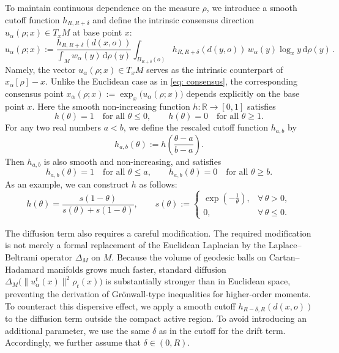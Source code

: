 \documentclass[11pt]{amsart}
\def\d{\mathrm{d}}
\newcommand{\p}{o}%
\newcommand{\dist}{d}%
\begin{document}
To maintain continuous dependence on the measure $\rho$, we introduce a smooth cutoff function $h_{R,R+\delta}$ and define the intrinsic consensus direction $u_\alpha(\rho; x) \in T_xM$ at base point $x$:
\[
u_\alpha(\rho; x):=
\frac{h_{R,R+\delta}(\dist(x,\p))}{\int_M w_\alpha(y)\, \d\rho(y)}
\int_{B_{R+\delta}(\p)} h_{R,R+\delta}(\dist(y,\p))\, w_\alpha(y)\log_x y\, \d\rho(y)\,.
\]
 Namely, the vector $u_\alpha(\rho;x)\in T_xM$ serves as the intrinsic counterpart of $x_\alpha[\rho]-x$.
Unlike the Euclidean case as in \eqref{eq: consensus}, the corresponding consensus point $x_\alpha(\rho;x):=\exp_x\bigl(u_\alpha(\rho;x)\bigr)$ depends explicitly on the base point $x$. Here the smooth non-increasing function $h:\mathbb{R}\to[0,1]$ satisfies
\[
h(\theta)=1 \quad \text{for all } \theta\le 0,
\qquad
h(\theta)=0 \quad \text{for all } \theta\ge 1.
\]
For any two real numbers \(a<b\), we define the rescaled cutoff function $h_{a,b}$ by
\[
h_{a,b}(\theta) :=h\!\left(\frac{\theta-a}{b-a}\right).
\]
Then \(h_{a,b}\) is also smooth and non-increasing, and satisfies
\[
h_{a,b}(\theta)=1 \quad \text{for all } \theta\le a,
\qquad
h_{a,b}(\theta)=0 \quad \text{for all } \theta\ge b.
\]
As an example, we can construct $h$ as follows:
\[
h(\theta)=\frac{s(1-\theta)}{s(\theta)+s(1-\theta)}, \qquad s(\theta) :=
\begin{cases}
\exp\!\left(-\frac{1}{\theta}\right), & \forall\,\theta>0,\\
0, & \forall\,\theta\le0.
\end{cases}
\]


The diffusion term also requires a careful modification. The required modification is not merely a formal replacement of the Euclidean Laplacian by the Laplace--Beltrami operator $\Delta_M$ on $M$. Because the volume of geodesic balls on Cartan--Hadamard manifolds grows much faster, standard diffusion $\Delta_M\bigl(\|u_\alpha^t(x)\|^2\rho_t(x)\bigr)$ is substantially stronger than in Euclidean space, preventing the derivation of Gr\"onwall-type inequalities for higher-order moments. To counteract this dispersive effect, we apply a smooth cutoff $h_{R-\delta,R}(\dist(x,\p))$ to the diffusion term outside the compact active region. To avoid introducing an additional parameter, we use the same $\delta$ as in the cutoff for the drift term. Accordingly, we further assume that $\delta\in (0,R)$.
\end{document}

